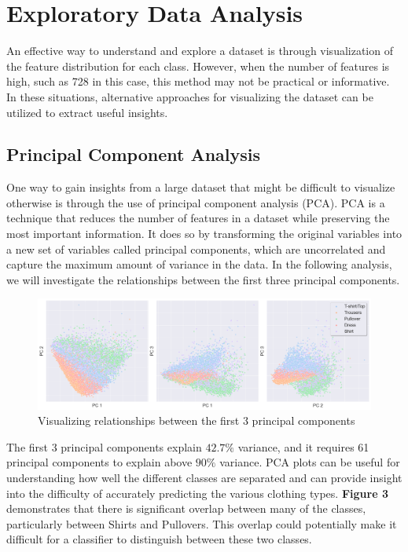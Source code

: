 \section{Exploratory Data Analysis}

An effective way to understand and explore a dataset is through visualization of the feature distribution for each class.
However, when the number of features is high, such as 728 in this case, this method may not be practical or informative.
In these situations, alternative approaches for visualizing the dataset can be utilized to extract useful insights.

\subsection{Principal Component Analysis}
One way to gain insights from a large dataset that might be difficult to visualize otherwise is through the use of principal component analysis (PCA).
PCA is a technique that reduces the number of features in a dataset while preserving the most important information.
It does so by transforming the original variables into a new set of variables called principal components, which are uncorrelated and capture the maximum amount of variance in the data.
In the following analysis, we will investigate the relationships between the first three principal components.

\begin{figure}[H]
    \includegraphics[scale=0.30]{figures_for_report/PCA}
    \captionsetup{justification=centering,margin=2cm}
    \caption{Visualizing relationships between the first 3 principal components}
\end{figure}

The first 3 principal components explain $42.7\%$ variance, and it requires 61 principal components to explain above $90\%$ variance.
PCA plots can be useful for understanding how well the different classes are separated and can provide insight into the difficulty of accurately predicting the various clothing types.
\textbf{Figure 3} demonstrates that there is significant overlap between many of the classes, particularly between Shirts and Pullovers.
This overlap could potentially make it difficult for a classifier to distinguish between these two classes.

